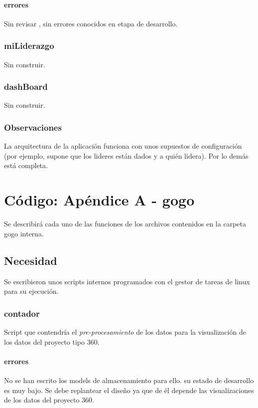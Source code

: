 \documentclass[10pt,a4paper]{book}
\begin{document}
	\subsubsection{errores}
	Sin revisar , sin errores conocidos en etapa de desarrollo.
	
	\subsection{miLiderazgo}
	Sin construir.
	
	\subsection{dashBoard}
	Sin construir.
	
	\subsection{Observaciones}
	La arquitectura de la aplicación funciona con unos supuestos de configuración (por ejemplo, supone que los lideres están dados y a quién lidera). Por lo demás está completa.

	\chapter{Código: Apéndice A - gogo}

	Se describirá cada uno de las funciones de los archivos contenidos en la carpeta gogo interna.

	\section{Necesidad}
	Se escribieron unos scripts internos programados con el gestor de tareas de linux para su ejecución.

	\subsection{contador}
	Script que contendría el \textit{pre-procesamiento} de los datos para la visualización de los datos del proyecto tipo 360.
	\subsubsection{errores}
	No se han escrito los models de almacenamiento para ello. su estado de desarrollo es muy bajo. Se debe replantear el diseño ya que de él depende las visualizaciones de los datos del proyecto 360.
	
\end{document}
